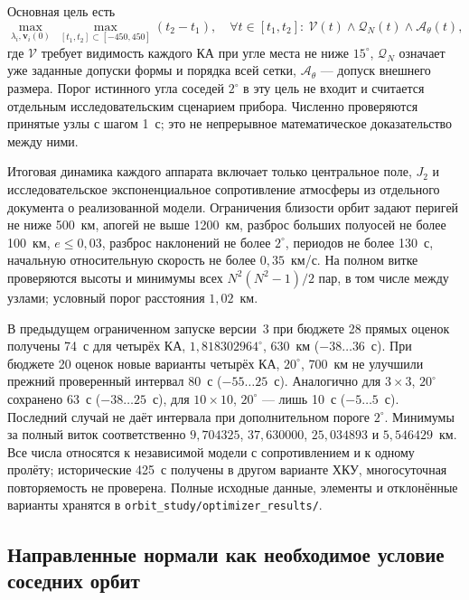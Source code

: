 \documentclass[a4paper,12pt]{article}
\begin{document}
Основная цель есть
\begin{equation}
 \max_{\lambda_i,\mathbf v_i(0)}\ \max_{[t_1,t_2]\subset[-450,450]}
 (t_2-t_1),\quad
 \forall t\in[t_1,t_2]:\ \mathcal V(t)\land\mathcal Q_N(t)
 \land\mathcal A_\theta(t),
\end{equation}
где $\mathcal V$ требует видимость каждого КА при угле места
не ниже $15^\circ$, $\mathcal Q_N$ означает уже заданные допуски
формы и порядка всей сетки, $\mathcal A_\theta$ --- допуск
внешнего размера. Порог истинного угла соседей $2^\circ$
в эту цель не входит и считается отдельным исследовательским
сценарием прибора. Численно проверяются принятые узлы с шагом
1~с; это не непрерывное математическое доказательство между ними.

Итоговая динамика каждого аппарата включает только центральное
поле, $J_2$ и исследовательское экспоненциальное сопротивление
атмосферы из отдельного документа о реализованной модели.
Ограничения близости орбит задают перигей не ниже 500~км,
апогей не выше 1200~км, разброс больших полуосей не более
100~км, $e\leq0{,}03$, разброс наклонений не более $2^\circ$,
периодов не более 130~с, начальную относительную скорость не
более $0{,}35$~км/с. На полном витке проверяются высоты и
минимумы всех $N^2(N^2-1)/2$ пар, в том числе между узлами;
условный порог расстояния $1{,}02$~км.

В предыдущем ограниченном запуске версии~3 при бюджете 28 прямых
оценок получены 74~с для четырёх КА,
$1{,}818302964^\circ$, 630~км ($-38\ldots36$~с).
При бюджете 20 оценок новые варианты четырёх КА, $20^\circ$,
700~км не улучшили прежний проверенный интервал 80~с
($-55\ldots25$~с). Аналогично для $3\times3$, $20^\circ$
сохранено 63~с ($-38\ldots25$~с), для $10\times10$,
$20^\circ$ --- лишь 10~с ($-5\ldots5$~с). Последний случай
не даёт интервала при дополнительном пороге $2^\circ$.
Минимумы за полный виток соответственно $9{,}704325$,
$37{,}630000$, $25{,}034893$ и $5{,}546429$~км.
Все числа относятся к независимой модели с сопротивлением и
к одному пролёту; исторические 425~с получены в другом
варианте ХКУ, многосуточная повторяемость не проверена.
Полные исходные данные, элементы и отклонённые варианты
хранятся в \texttt{orbit\_study/optimizer\_results/}.

\subsection{Направленные нормали как необходимое условие соседних орбит}
\end{document}
